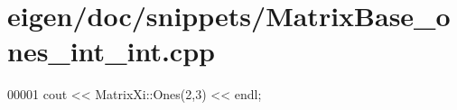 \hypertarget{eigen_2doc_2snippets_2_matrix_base__ones__int__int_8cpp_source}{}\section{eigen/doc/snippets/\+Matrix\+Base\+\_\+ones\+\_\+int\+\_\+int.cpp}
\label{eigen_2doc_2snippets_2_matrix_base__ones__int__int_8cpp_source}

\begin{DoxyCode}
00001 cout << MatrixXi::Ones(2,3) << endl;
\end{DoxyCode}
